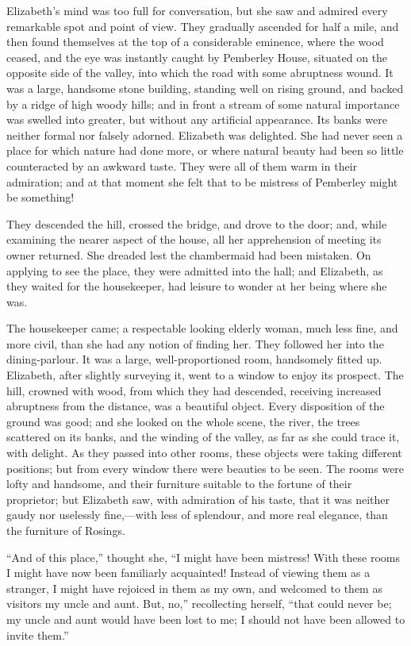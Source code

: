\documentclass[12pt,openright]{book}
\begin{document}
Elizabeth’s mind was too full for conversation, but she saw and admired every remarkable spot and point of view. They gradually ascended for half a mile, and then found themselves at the top of a considerable eminence, where the wood ceased, and the eye was instantly caught by Pemberley House, situated on the opposite side of the valley, into which the road with some abruptness wound. It was a large, handsome stone building, standing well on rising ground, and backed by a ridge of high woody hills; and in front a stream of some natural importance was swelled into greater, but without any artificial appearance. Its banks were neither formal nor falsely adorned. Elizabeth was delighted. She had never seen a place for which nature had done more, or where natural beauty had been so little counteracted by an awkward taste. They were all of them warm in their admiration; and at that moment she felt that to be mistress of Pemberley might be something!

They descended the hill, crossed the bridge, and drove to the door; and, while examining the nearer aspect of the house, all her apprehension of meeting its owner returned. She dreaded lest the chambermaid had been mistaken. On applying to see the place, they were admitted into the hall; and Elizabeth, as they waited for the housekeeper, had leisure to wonder at her being where she was.

The housekeeper came; a respectable looking elderly woman, much less fine, and more civil, than she had any notion of finding her. They followed her into the dining-parlour. It was a large, well-proportioned room, handsomely fitted up. Elizabeth, after slightly surveying it, went to a window to enjoy its prospect. The hill, crowned with wood, from which they had descended, receiving increased abruptness from the distance, was a beautiful object. Every disposition of the ground was good; and she looked on the whole scene, the river, the trees scattered on its banks, and the winding of the valley, as far as she could trace it, with delight. As they passed into other rooms, these objects were taking different positions; but from every window there were beauties to be seen. The rooms were lofty and handsome, and their furniture suitable to the fortune of their proprietor; but Elizabeth saw, with admiration of his taste, that it was neither gaudy nor uselessly fine,—with less of splendour, and more real elegance, than the furniture of Rosings.

“And of this place,” thought she, “I might have been mistress! With these rooms I might have now been familiarly acquainted! Instead of viewing them as a stranger, I might have rejoiced in them as my own, and welcomed to them as visitors my uncle and aunt. But, no,” recollecting herself, “that could never be; my uncle and aunt would have been lost to me; I should not have been allowed to invite them.”
\end{document}
